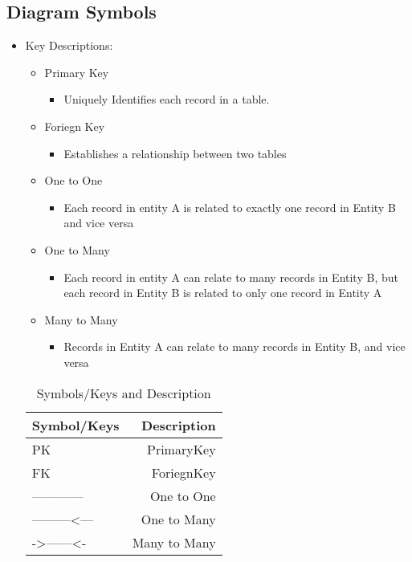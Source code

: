 \documentclass{article}
\begin{document}
\subsection{Diagram Symbols}
\begin{itemize}
\item Key Descriptions:
    \begin{itemize}
    \item Primary Key
    \begin{itemize}
        \item Uniquely Identifies each record in a table.
    \end{itemize}
    \item Foriegn Key
    \begin{itemize}
        \item Establishes a relationship between two tables
    \end{itemize}
    \item One to One
    \begin{itemize}
        \item Each record in entity A is related to exactly one record in Entity B and vice versa
    \end{itemize}
    \item One to Many
    \begin{itemize}
        \item Each record in entity A can relate to many records in Entity B, but each record in Entity B is related to only one record in Entity A
    \end{itemize}
    \item Many to Many
    \begin{itemize}
        \item Records in Entity A can relate to many records in Entity B, and vice versa
    \end{itemize}

    \end{itemize}
\begin{table}
\centering
\begin{tabular}{l|r}
Symbol/Keys & Description \\\hline
PK & PrimaryKey \\
FK & ForiegnKey\\
---\textbar{}------\textbar{}--- & One to One\\
---\textbar{}------\textless{}--- & One to Many\\
-\textgreater{}------\textless{}- & Many to Many
\end{tabular}
\caption{\label{tab:widgets}Symbols/Keys and Description}
\end{table}

\end{itemize}
\end{document}

